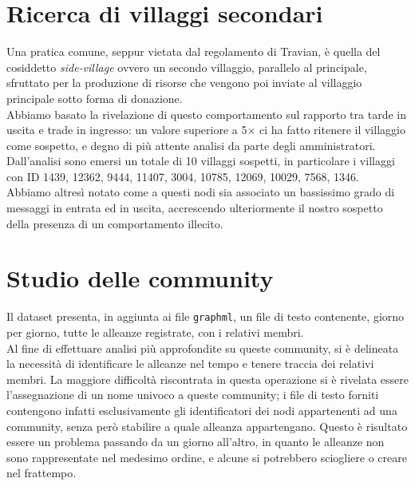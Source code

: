 \section{Ricerca di villaggi secondari}
Una pratica comune, seppur vietata dal regolamento di Travian, è quella del cosiddetto \textit{side-village} ovvero un secondo villaggio, parallelo al principale, sfruttato per la produzione di risorse che vengono poi inviate al villaggio principale sotto forma di donazione.\\
Abbiamo basato la rivelazione di questo comportamento sul rapporto tra tarde in uscita e trade in ingresso: un valore superiore a 5$\times$ ci ha fatto ritenere il villaggio come sospetto, e degno di più attente analisi da parte degli amministratori.\\
Dall'analisi sono emersi un totale di 10 villaggi sospetti, in particolare i villaggi con ID 1439, 12362, 9444, 11407, 3004, 10785, 12069, 10029, 7568, 1346.\\
Abbiamo altresì notato come a questi nodi sia associato un bassissimo grado di messaggi in entrata ed in uscita, accrescendo ulteriormente il nostro sospetto della presenza di un comportamento illecito.

\section{Studio delle community}
Il dataset presenta, in aggiunta ai file \texttt{graphml}, un file di testo contenente, giorno per giorno, tutte le alleanze registrate, con i relativi membri.\\
Al fine di effettuare analisi più approfondite su queste community, si è delineata la necessità di identificare le alleanze nel tempo e tenere traccia dei relativi membri.
La maggiore difficoltà riscontrata in questa operazione si è rivelata essere l'assegnazione di un nome univoco a queste community; i file di testo forniti contengono infatti esclusivamente gli identificatori dei nodi appartenenti ad una community, senza però stabilire a quale alleanza appartengano.
Questo è risultato essere un problema passando da un giorno all'altro, in quanto le alleanze non sono rappresentate nel medesimo ordine, e alcune si potrebbero sciogliere o creare nel frattempo.

